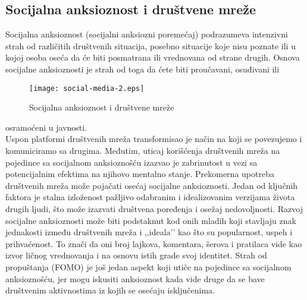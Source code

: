 \documentclass[a4paper]{article}
\begin{document}
            \subsection{Socijalna anksioznost i društvene mreže}
		\label{subsec:podnaslov4}
	
	         Socijalna anksioznost (socijalni anksiozni poremećaj) podrazumeva intenzivni strah od različitih društvenih situacija, posebno situacije koje nisu poznate ili u kojoj osoba oseća da će biti posmatrana ili vrednovana od strane drugih. Osnova socijalne anksioznosti je strah od
              toga da ćete biti proučavani, osuđivani ili 	\begin{figure}[h]
            \caption{Socijalna anksioznost i društvene mreže}
            \centering
            \texttt{[image: social-media-2.eps]}
            \end{figure} osramoćeni u javnosti. \\ 
    
            Uspon platformi društvenih mreža transformisao je način na koji se povezujemo i komuniciramo sa drugima. Međutim, uticaj korišćenja društvenih mreža na pojedince sa socijalnom anksioznošću izazvao je zabrinutost u vezi sa potencijalnim efektima na njihovo mentalno stanje. Prekomerna upotreba društvenih mreža može pojačati osećaj socijalne anksioznosti. Jedan od ključnih faktora je stalna izloženost pažljivo odabranim i idealizovanim verzijama života drugih ljudi, što može izazvati društvena poređenja i osežaj nedovoljnosti. Razvoj socijalne anksioznosti može biti podstaknut kod onih mladih koji stavljaju znak jednakosti između društvenih mreža i ,,ideala’’ kao što su popularnost, uspeh i prihvaćenost. To znači da oni broj lajkova, komentara, šerova i pratilaca vide kao izvor ličnog vrednovanja i na osnovu istih grade svoj identitet. Strah od propuštanja (FOMO) je još jedan aspekt koji utiče na pojedince sa socijalnom anksioznošću, jer mogu iskusiti anksioznost kada vide druge da se bave društvenim aktivnostima iz kojih se osećaju isključenima. \\
        
\end{document}
